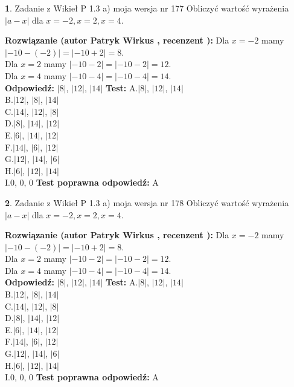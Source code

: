 \documentclass[12pt, a4paper]{article}
\theoremstyle{definition} %
\newtheorem{zad}{}
\newcommand{\zadStart}[1]{\begin{zad}#1\newline}
\newcommand{\zadStop}{\end{zad}}
\newcommand{\rozwStart}[2]{\noindent \textbf{Rozwiązanie (autor #1 , recenzent #2): }\newline}
\newcommand{\rozwStop}{\newline}
\newcommand{\odpStart}{\noindent \textbf{Odpowiedź:}\newline}
\newcommand{\odpStop}{\newline}
\newcommand{\testStart}{\noindent \textbf{Test:}\newline}
\newcommand{\testStop}{\newline}
\newcommand{\kluczStart}{\noindent \textbf{Test poprawna odpowiedź:}\newline}
\newcommand{\kluczStop}{\newline}
\begin{document}
\zadStart{Zadanie z Wikieł P 1.3 a) moja wersja nr 177}
Obliczyć wartość wyrażenia $|a - x|$ dla $x=-2,x=2,x=4$.
\zadStop
\rozwStart{Patryk Wirkus}{}
Dla $x = -2$ mamy $|-10 - (-2)| = |-10 + 2| = 8$.\\
Dla $x = 2$ mamy $|-10 - 2| = |-10 - 2| = 12$.\\
Dla $x = 4$ mamy $|-10 - 4| = |-10 - 4| = 14$.\\
\rozwStop
\odpStart
$|8|$, $|12|$, $|14|$
\odpStop
\testStart
A.$|8|$, $|12|$, $|14|$\\
B.$|12|$, $|8|$, $|14|$\\
C.$|14|$, $|12|$, $|8|$\\
D.$|8|$, $|14|$, $|12|$\\
E.$|6|$, $|14|$, $|12|$\\
F.$|14|$, $|6|$, $|12|$\\
G.$|12|$, $|14|$, $|6|$\\
H.$|6|$, $|12|$, $|14|$\\
I.$0$, $0$, $0$
\testStop
\kluczStart
A
\kluczStop



\zadStart{Zadanie z Wikieł P 1.3 a) moja wersja nr 178}
Obliczyć wartość wyrażenia $|a - x|$ dla $x=-2,x=2,x=4$.
\zadStop
\rozwStart{Patryk Wirkus}{}
Dla $x = -2$ mamy $|-10 - (-2)| = |-10 + 2| = 8$.\\
Dla $x = 2$ mamy $|-10 - 2| = |-10 - 2| = 12$.\\
Dla $x = 4$ mamy $|-10 - 4| = |-10 - 4| = 14$.\\
\rozwStop
\odpStart
$|8|$, $|12|$, $|14|$
\odpStop
\testStart
A.$|8|$, $|12|$, $|14|$\\
B.$|12|$, $|8|$, $|14|$\\
C.$|14|$, $|12|$, $|8|$\\
D.$|8|$, $|14|$, $|12|$\\
E.$|6|$, $|14|$, $|12|$\\
F.$|14|$, $|6|$, $|12|$\\
G.$|12|$, $|14|$, $|6|$\\
H.$|6|$, $|12|$, $|14|$\\
I.$0$, $0$, $0$
\testStop
\kluczStart
A
\kluczStop
\end{document}
